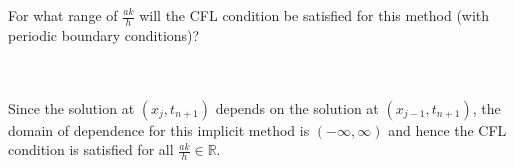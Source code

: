For what range of $\frac{ak}{h}$ will the CFL condition be satisfied for this method (with periodic boundary 
conditions)?

\begin{solution}\ \\\\
    Since the solution at $(x_j, t_{n+1})$ depends on the solution at $(x_{j-1}, t_{n+1})$, the domain of dependence for
    this implicit method is $(-\infty, \infty)$ and hence the CFL condition is satisfied for all 
    $\frac{ak}{h} \in \mathbb{R}$.
    \hfill\vfill
    \ \\
\end{solution}